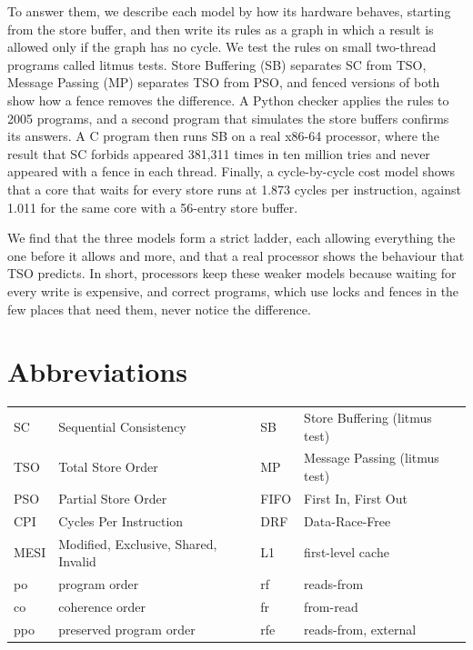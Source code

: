 To answer them, we describe each model by how its hardware behaves, starting from the store buffer, and then write its rules as a graph in which a result is allowed only if the graph has no cycle. We test the rules on small two-thread programs called litmus tests. Store Buffering (SB) separates SC from TSO, Message Passing (MP) separates TSO from PSO, and fenced versions of both show how a fence removes the difference. A Python checker applies the rules to 2005 programs, and a second program that simulates the store buffers confirms its answers. A C program then runs SB on a real x86-64 processor, where the result that SC forbids appeared 381,311 times in ten million tries and never appeared with a fence in each thread. Finally, a cycle-by-cycle cost model shows that a core that waits for every store runs at 1.873 cycles per instruction, against 1.011 for the same core with a 56-entry store buffer.

We find that the three models form a strict ladder, each allowing everything the one before it allows and more, and that a real processor shows the behaviour that TSO predicts. In short, processors keep these weaker models because waiting for every write is expensive, and correct programs, which use locks and fences in the few places that need them, never notice the difference.
\clearpage

\chapter*{Abbreviations}
\begin{center}
\small
\begin{tabular}{@{}ll@{\hspace{1.2cm}}ll@{}}
SC & Sequential Consistency & SB & Store Buffering (litmus test)\\
TSO & Total Store Order & MP & Message Passing (litmus test)\\
PSO & Partial Store Order & FIFO & First In, First Out\\
CPI & Cycles Per Instruction & DRF & Data-Race-Free\\
MESI & Modified, Exclusive, Shared, Invalid & L1 & first-level cache\\
po & program order & rf & reads-from\\
co & coherence order & fr & from-read\\
ppo & preserved program order & rfe & reads-from, external\\
\end{tabular}
\end{center}

